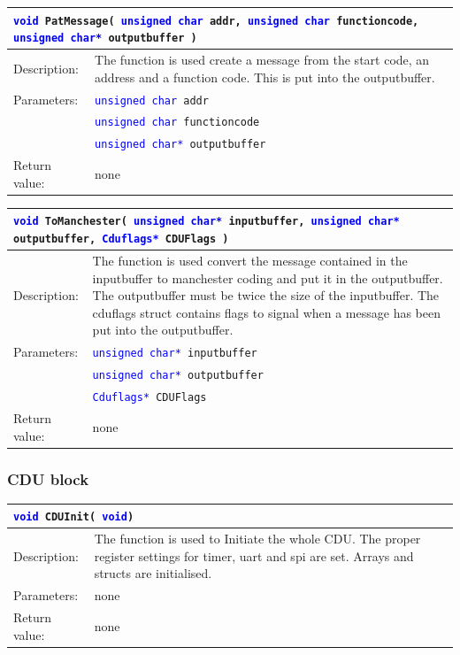 \begin{table}[H]
\begin{tabular}{l p{12.5cm}}
\multicolumn{2}{p{15cm}}{\texttt{\textcolor{blue}{void} PatMessage( \texttt{\textcolor{blue}{unsigned char} addr, \textcolor{blue}{unsigned char} functioncode, \textcolor{blue}{unsigned char*} outputbuffer  }) } } \\
\hline
Description:& The function is used create a message from the start code, an address and a function code. This is put into the outputbuffer.\\
Parameters:&\texttt{\textcolor{blue}{unsigned char} addr}\\
&\texttt{\textcolor{blue}{unsigned char} functioncode}\\
&\texttt{\textcolor{blue}{unsigned char*} outputbuffer}\\
Return value:&none\\
\end{tabular}
\end{table}

\begin{table}[H]
\begin{tabular}{l p{12.5cm}}
\multicolumn{2}{p{15cm}}{\texttt{\textcolor{blue}{void} ToManchester( \texttt{\textcolor{blue}{unsigned char*} inputbuffer, \textcolor{blue}{unsigned char*} outputbuffer, \textcolor{blue}{Cduflags*} CDUFlags  }) } } \\
\hline
Description:& The function is used convert the message contained in the inputbuffer to manchester coding and put it in the outputbuffer. The outputbuffer must be twice the size of the inputbuffer. The cduflags struct contains flags to signal when a message has been put into the outputbuffer.\\
Parameters:&\texttt{\textcolor{blue}{unsigned char*} inputbuffer}\\
&\texttt{\textcolor{blue}{unsigned char*} outputbuffer}\\
&\texttt{\textcolor{blue}{Cduflags*} CDUFlags}\\
Return value:&none\\
\end{tabular}
\end{table}

\subsubsection{CDU block}
\begin{table}[H]
\begin{tabular}{l p{12.5cm}}
\multicolumn{2}{l}{\texttt{\textcolor{blue}{void} CDUInit( \texttt{\textcolor{blue}{void}})}} \\
\hline
Description:& The function is used to Initiate the whole CDU. The proper register settings for timer, uart and spi are set. Arrays and structs are initialised.\\
Parameters:&none\\
Return value:&none\\
\end{tabular}
\end{table}

